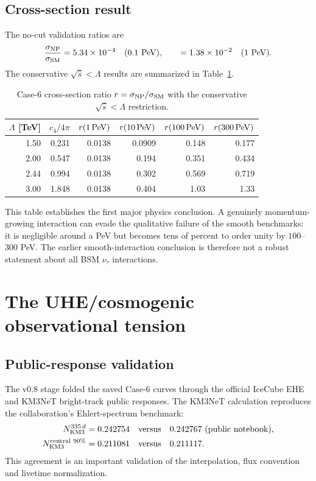 \documentclass[11pt,a4paper]{article}
\begin{document}
\subsection{Cross-section result}
The no-cut validation ratios are
\begin{equation}
 {\sigma_{\rm NP}\over\sigma_{\rm SM}}
 =5.34\times10^{-4}\quad(0.1\ {\rm PeV}),
 \qquad
 =1.38\times10^{-2}\quad(1\ {\rm PeV}).
 \label{eq:nocut}
\end{equation}
The conservative $\sqrt{\hat s}<\Lambda$ results are summarized in
Table~\ref{tab:crosssection}.

\begin{table}[t]
\centering
\caption{Case-6 cross-section ratio
$r=\sigma_{\rm NP}/\sigma_{\rm SM}$ with the conservative
$\sqrt{\hat s}<\Lambda$ restriction.}
\label{tab:crosssection}
\begin{tabular}{@{}rrrrrr@{}}
\toprule
$\Lambda$ [TeV] & $c_4/4\pi$ & $r(1\,{\rm PeV})$ &
$r(10\,{\rm PeV})$ & $r(100\,{\rm PeV})$ & $r(300\,{\rm PeV})$\\
\midrule
1.50 & 0.231 & 0.0138 & 0.0909 & 0.148 & 0.177\\
2.00 & 0.547 & 0.0138 & 0.194  & 0.351 & 0.434\\
2.44 & 0.994 & 0.0138 & 0.302  & 0.569 & 0.719\\
3.00 & 1.848 & 0.0138 & 0.404  & 1.03  & 1.33\\
\bottomrule
\end{tabular}
\end{table}

This table establishes the first major physics conclusion.  A genuinely
momentum-growing interaction can evade the qualitative failure of the smooth
benchmarks: it is negligible around a PeV but becomes tens of percent to
order unity by $100$--$300$ PeV.  The earlier smooth-interaction conclusion is
therefore not a robust statement about all BSM $\nu_\tau$ interactions.

\section{The UHE/cosmogenic observational tension}
\subsection{Public-response validation}
The v0.8 stage folded the saved Case-6 curves through the official IceCube EHE
and KM3NeT bright-track public responses.  The KM3NeT calculation reproduces
the collaboration's Ehlert-spectrum benchmark:
\begin{align}
 N_{\rm KM3}^{335\,d}&=0.242754
 \quad {\rm versus}\quad 0.242767\ {\rm(public\ notebook)},\\
 N_{\rm KM3}^{\rm central\ 90\%}&=0.211081
 \quad {\rm versus}\quad 0.211117.
 \label{eq:kmvalidation}
\end{align}
This agreement is an important validation of the interpolation, flux
convention and livetime normalization.
\end{document}
